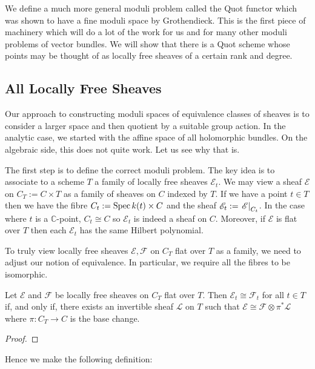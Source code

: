 \documentclass[12pt]{ociamthesis}  %
\begin{document}
We define a much more general moduli problem called
the Quot functor which was shown to have a fine moduli space by
Grothendieck. This is the first piece of machinery which will do a
lot of the work for us and for many other moduli problems of vector
bundles. We will show that there is a Quot scheme whose points
may be thought of as locally free sheaves of a certain rank and
degree.

\subsection{All Locally Free Sheaves}

Our approach to constructing moduli spaces of equivalence classes of
sheaves is to consider a larger space and then quotient by a suitable
group action. In the analytic case, we started with the affine space of
all holomorphic bundles. On the algebraic side, this does not quite work.
Let us see why that is.

The first step is to define the correct moduli problem. The key idea
is to associate to a scheme $T$ a family of locally free sheaves
$\mathscr E_t$. We may view a sheaf $\mathscr E$ on $C_T := C\times T$
as a family of sheaves on $C$ indexed by $T$. If we have a point $t\in T$
then we have the fibre $C_t := \operatorname{Spec} k(t) \times C$ and the sheaf
$\mathscr E_t := \left.{\mathscr E}\right\vert_{C_t}$. In the case where
$t$ is a $\mathbb{C}$-point, $C_t \cong C$ so $\mathscr E_t$ is indeed
a sheaf on $C$. Moreover, if $\mathscr E$ is flat over $T$ then
each $\mathscr E_t$ has the same Hilbert polynomial.

To truly view locally free sheaves $\mathscr E,\mathscr F$ on
$C_T$ flat over $T$ as a family, we need to adjust our notion of
equivalence. In particular, we require all the fibres to be isomorphic.

\begin{lemma}
  Let $\mathscr E$ and $\mathscr F$ be locally free sheaves on $C_T$
  flat over $T$. Then $\mathscr E_t\cong\mathscr F_t$ for all $t\in T$
  if, and only if, there exists an invertible sheaf $\mathscr L$ on
  $T$ such that $\mathscr E \cong \mathscr F \otimes \pi^*\mathscr L$
  where $\pi : C_T \to C$ is the base change.
  \begin{proof}
    \missingproof
  \end{proof}
\end{lemma}

Hence we make the following definition:
\end{document}
